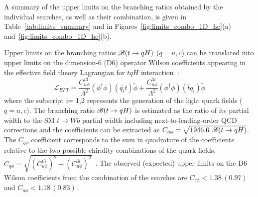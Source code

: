 A summary of the upper limits on the branching ratios obtained by the individual searches, as well as their combination, is given  
in Table~\ref{tab:limits_summary} and in Figures~\ref{fig:limits_combo_1D_hc}(a) and~\ref{fig:limits_combo_1D_hc}(b).

Upper limits on the branching ratios $\mathscr{B}(t\to qH)$ ($q=u,c$) can be translated into upper limits on the dimension-6 (D6) operator Wilson coefficients appearing in the effective field theory Lagrangian for $tqH$ interaction~\cite{fcnc_production_theory}:
%
\begin{equation}
  \mathcal{L}_{EFT} = \frac{C^{i3}_{u\phi}}{\Lambda^{2}}(\phi^{\dagger}\phi)(\bar{q_{i}}t)\tilde{\phi} + \frac{C^{3i}_{u\phi}}{\Lambda^{2}}(\phi^{\dagger}\phi)(\bar{t}q_{i})\tilde{\phi}
  \label{eq:eq01}
\end{equation}
%
where the subscript i= 1,2 represents the generation of the light quark fields ($q=u,c$).
The branching ratio $\mathscr{B}(t\to qH)$ is estimated as the ratio of its partial width to the SM $t \to Wb$ partial width including next-to-leading-order QCD corrections and the coefficients can be extracted as $C_{q\phi} = \sqrt{1946.6~\mathscr{B}(t\to qH)}$. The $C_{q\phi}$ coefficient corresponds to the sum in quadrature of the coefficients relative to the two possible chirality combinations of the quark fields,
$C_{q\phi} =\sqrt{(C^{i3}_{u\phi})^2 + (C^{3i}_{u\phi})^2}$~\cite{fcnc_production_theory}. The observed (expected) upper limits on the D6 Wilson coefficients from the combination of the searches are $C_{c\phi}<1.38\,(0.97)$ and $C_{u\phi}<1.18\,(0.83)$. 

